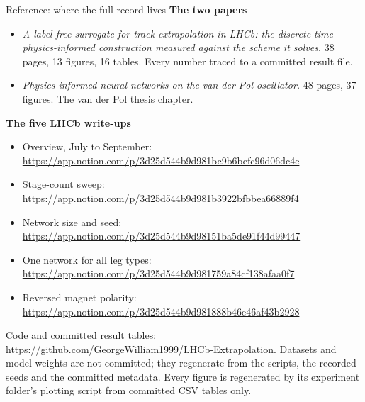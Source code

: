 \documentclass[aspectratio=169,10pt]{beamer}
\begin{document}
\begin{frame}[shrink=25]{Reference: where the full record lives}
  \vspace{2mm}
  \textbf{The two papers}
  \begin{itemize}\small
    \item \emph{A label-free surrogate for track extrapolation in LHCb: the
      discrete-time physics-informed construction measured against the scheme it
      solves.} 38 pages, 13 figures, 16 tables. Every number traced to a
      committed result file.
    \item \emph{Physics-informed neural networks on the van der Pol
      oscillator.} 48 pages, 37 figures. The van der Pol thesis chapter.
  \end{itemize}
  \vspace{3mm}

  \textbf{The five LHCb write-ups}
  {\small
  \begin{itemize}
    \item Overview, July to September:
      \url{https://app.notion.com/p/3d25d544b9d981bc9b6befc96d06dc4e}
    \item Stage-count sweep:
      \url{https://app.notion.com/p/3d25d544b9d981b3922bfbbea66889f4}
    \item Network size and seed:
      \url{https://app.notion.com/p/3d25d544b9d98151ba5de91f44d99447}
    \item One network for all leg types:
      \url{https://app.notion.com/p/3d25d544b9d981759a84cf138afaa0f7}
    \item Reversed magnet polarity:
      \url{https://app.notion.com/p/3d25d544b9d981888b46e46af43b2928}
  \end{itemize}}
  \vspace{3mm}

  {\small Code and committed result tables:
   \url{https://github.com/GeorgeWilliam1999/LHCb-Extrapolation}. Datasets and
   model weights are not committed; they regenerate from the scripts, the
   recorded seeds and the committed metadata. Every figure is regenerated by its
   experiment folder's plotting script from committed CSV tables only.}
\end{frame}
\end{document}
